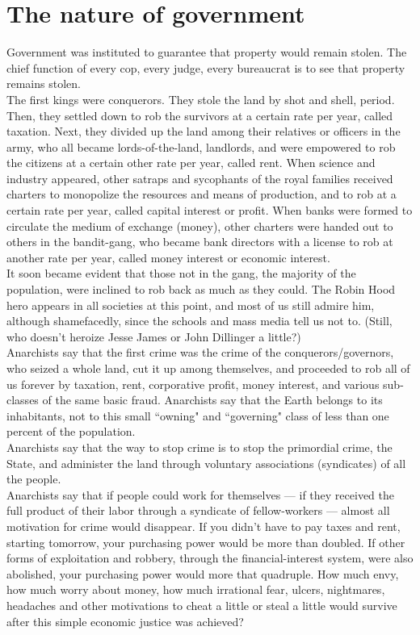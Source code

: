 \section*{The nature of government}

Government was instituted to guarantee that property would remain stolen. The chief function of every cop, every judge, every bureaucrat is to see that property remains stolen.\\
The first kings were conquerors. They stole the land by shot and shell, period. Then, they settled down to rob the survivors at a certain rate per year, called taxation. Next, they divided up the land among their relatives or officers in the army, who all became lords-of-the-land, landlords, and were empowered to rob the citizens at a certain other rate per year, called rent. When science and industry appeared, other satraps and sycophants of the royal families received charters to monopolize the resources and means of production, and to rob at a certain rate per year, called capital interest or profit. When banks were formed to circulate the medium of exchange (money), other charters were handed out to others in the bandit-gang, who became bank directors with a license to rob at another rate per year, called money interest or economic interest.\\
It soon became evident that those not in the gang, the majority of the population, were inclined to rob back as much as they could. The Robin Hood hero appears in all societies at this point, and most of us still admire him, although shamefacedly, since the schools and mass media tell us not to. (Still, who doesn't heroize Jesse James or John Dillinger a little?)\\
Anarchists say that the first crime was the crime of the conquerors/governors, who seized a whole land, cut it up among themselves, and proceeded to rob all of us forever by taxation, rent, corporative profit, money interest, and various sub-classes of the same basic fraud. Anarchists say that the Earth belongs to its inhabitants, not to this small ``owning" and ``governing" class of less than one percent of the population.\\
Anarchists say that the way to stop crime is to stop the primordial crime, the State, and administer the land through voluntary associations (syndicates) of all the people.\\
Anarchists say that if people could work for themselves --- if they received the full product of their labor through a syndicate of fellow-workers --- almost all motivation for crime would disappear. If you didn't have to pay taxes and rent, starting tomorrow, your purchasing power would be more than doubled. If other forms of exploitation and robbery, through the financial-interest system, were also abolished, your purchasing power would more that quadruple. How much envy, how much worry about money, how much irrational fear, ulcers, nightmares, headaches and other motivations to cheat a little or steal a little would survive after this simple economic justice was achieved?

